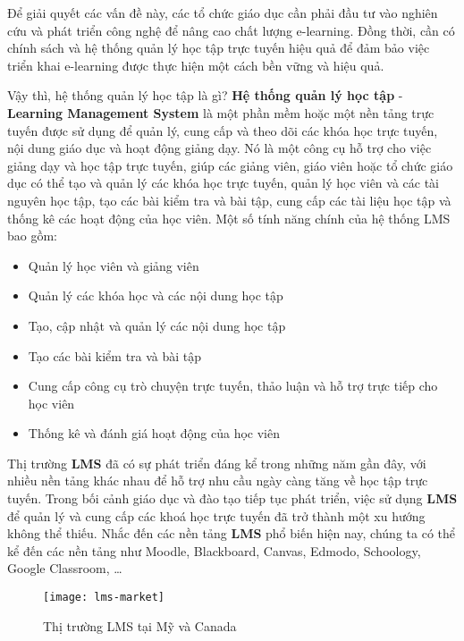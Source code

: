 \documentclass[../Thesis.tex]{subfiles}
\begin{document}
Để giải quyết các vấn đề này, các tổ chức giáo dục cần phải đầu tư vào nghiên cứu và phát triển công nghệ để nâng cao chất lượng e-learning. Đồng thời, cần có chính sách và hệ thống quản lý học tập trực tuyến hiệu quả để đảm bảo việc triển khai e-learning được thực hiện một cách bền vững và hiệu quả.

Vậy thì, hệ thống quản lý học tập là gì? \textbf{Hệ thống quản lý học tập} - \textbf{Learning Management System} là một phần mềm hoặc một nền tảng trực tuyến được sử dụng để quản lý, cung cấp và theo dõi các khóa học trực tuyến, nội dung giáo dục và hoạt động giảng dạy. Nó là một công cụ hỗ trợ cho việc giảng dạy và học tập trực tuyến, giúp các giảng viên, giáo viên hoặc tổ chức giáo dục có thể tạo và quản lý các khóa học trực tuyến, quản lý học viên và các tài nguyên học tập, tạo các bài kiểm tra và bài tập, cung cấp các tài liệu học tập và thống kê các hoạt động của học viên.
Một số tính năng chính của hệ thống LMS bao gồm:
\begin{itemize}
    \item Quản lý học viên và giảng viên
    \item Quản lý các khóa học và các nội dung học tập
    \item Tạo, cập nhật và quản lý các nội dung học tập
    \item Tạo các bài kiểm tra và bài tập
    \item Cung cấp công cụ trò chuyện trực tuyến, thảo luận và hỗ trợ trực tiếp cho học viên
    \item Thống kê và đánh giá hoạt động của học viên
\end{itemize}

Thị trường \textbf{LMS} đã có sự phát triển đáng kể trong những năm gần đây, với nhiều nền tảng khác nhau để hỗ trợ nhu cầu ngày
càng tăng về học tập trực tuyến. Trong bối cảnh giáo dục và đào tạo tiếp tục phát triển, việc sử dụng \textbf{LMS} để quản lý và cung cấp các khoá
học trực tuyến đã trở thành một xu hướng không thể thiếu. Nhắc đến các nền tảng \textbf{LMS} phổ biến hiện nay, chúng ta có thể kể đến các nền tảng như Moodle, Blackboard, Canvas, Edmodo, Schoology, Google Classroom, …

\begin{figure}[ht!]
\centering\texttt{[image: lms-market]}
\caption{Thị trường LMS tại Mỹ và Canada}
\label{fig:lms-market}
\end{figure}
\end{document}
